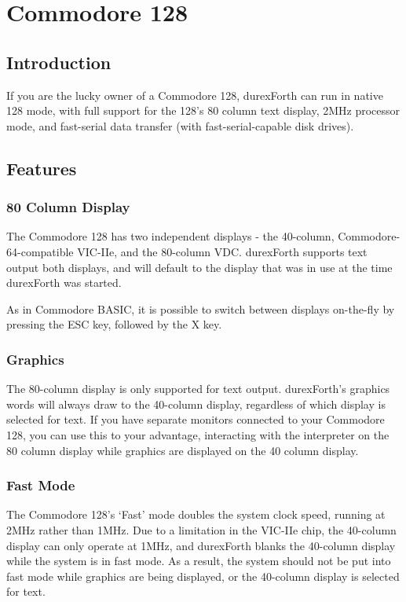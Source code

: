 \chapter{Commodore 128}

\section{Introduction}

If you are the lucky owner of a Commodore 128, durexForth can run in native 128 mode, with full support for the 128's 80 column text display, 2MHz processor mode, and fast-serial data transfer (with fast-serial-capable disk drives).

\section{Features}

\subsection{80 Column Display}

The Commodore 128 has two independent displays - the 40-column, Commodore-64-compatible VIC-IIe, and the 80-column VDC. durexForth supports text output both displays, and will default to the display that was in use at the time durexForth was started.

As in Commodore BASIC, it is possible to switch between displays on-the-fly by pressing the ESC key, followed by the X key.

\subsection{Graphics}

The 80-column display is only supported for text output. durexForth's graphics words will always draw to the 40-column display, regardless of which display is selected for text. If you have separate monitors connected to your Commodore 128, you can use this to your advantage, interacting with the interpreter on the 80 column display while graphics are displayed on the 40 column display.

\subsection{Fast Mode}

The Commodore 128's `Fast' mode doubles the system clock speed, running at 2MHz rather than 1MHz. Due to a limitation in the VIC-IIe chip, the 40-column display can only operate at 1MHz, and durexForth blanks the 40-column display while the system is in fast mode. As a result, the system should not be put into fast mode while graphics are being displayed, or the 40-column display is selected for text.

